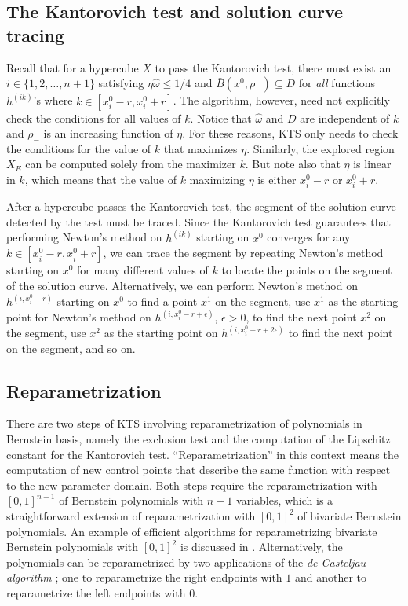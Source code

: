 \documentclass{article}
\begin{document}
\subsection{The Kantorovich test and solution curve tracing}
\label{section_impkan}

Recall that for a hypercube $X$ to pass the Kantorovich test,
there must exist an $i \in \{1,2,\ldots,n+1\}$ satisfying $\eta \hat
\omega \leq 1/4$ and $\bar{B}(x^0,\rho_-) \subseteq D$ for
\emph{all} functions $h^{(ik)}$'s where $k \in [x^0_i-r,
x^0_i+r]$. The algorithm, however, need not explicitly check the
conditions for all values of $k$.  Notice that $\hat \omega$ and
$D$ are independent of $k$ and $\rho_-$ is an increasing function
of $\eta$.  For these reasons, KTS only needs to check the
conditions for the value of $k$ that maximizes $\eta$. Similarly,
the explored region $X_E$ can be computed solely from the
maximizer $k$.  But note also that $\eta$ is linear in $k$, which
means that the value of $k$ maximizing $\eta$ is either $x^0_i-r$
or $x^0_i+r$.

After a hypercube passes the Kantorovich test, the segment of the
solution curve detected by the test must be traced.  Since
the Kantorovich test guarantees that performing Newton's
method on $h^{(ik)}$ starting on $x^0$ converges for any $k \in
[x^0_i-r, x^0_i+r]$, we can trace the segment by
repeating Newton's method starting on $x^0$ for many different
values of $k$ to locate the points on the segment of the
solution curve.  Alternatively, we can perform Newton's method on $h^{(i,x^0_i-r)}$ starting on $x^0$ to find a point $x^1$ on the segment, use $x^1$ as the starting point for Newton's method on $h^{(i,x^0_i-r+\epsilon)}$, $\epsilon > 0$,
to find the next point $x^2$ on the segment, use $x^2$ as the starting point on 
$h^{(i,x^0_i-r+2\epsilon)}$ to find the next point on the segment, and so on.


\subsection{Reparametrization}
\label{sec:reparam}

There are two steps of KTS involving reparametrization of
polynomials in Bernstein basis, namely the exclusion test and the
computation of the Lipschitz constant for the Kantorovich test.
``Reparametrization'' in this context means the computation of new
control points that describe the same function with respect
to the new parameter domain.
Both steps require the reparametrization with $[0,1]^{n+1}$ of
Bernstein polynomials with $n+1$ variables, which is a
straightforward extension of reparametrization with $[0,1]^2$ of
bivariate Bernstein polynomials.  An example of efficient 
algorithms for reparametrizing bivariate Bernstein polynomials with $[0,1]^2$ is discussed in \cite{srijuntongsiri_basis}.  Alternatively, the polynomials can be reparametrized by two applications of the \emph{de Casteljau algorithm} \cite{patrikalakis}; one to reparametrize the right endpoints with $1$ and another to reparametrize the left endpoints with $0$.
\end{document}
